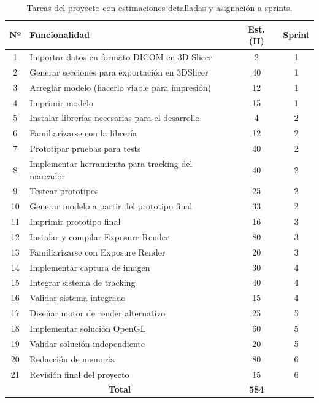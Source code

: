 \begin{table}[h!]
  \centering
  \begin{tabular}{|c|p{7.5cm}|c|c|}
  \hline
  \rowcolor{udcpink!25}
  \textbf{Nº} & \textbf{Funcionalidad} & \textbf{Est. (H)} & \textbf{Sprint} \\\hline
  1     &   Importar datos en formato DICOM en 3D Slicer    &   2     & 1 \\
  2     &   Generar secciones para exportación en 3DSlicer &   40    & 1 \\
  3     &   Arreglar modelo (hacerlo viable para impresión) &   12    & 1 \\
  4     &   Imprimir modelo                                  &   15    & 1 \\
  5     &   Instalar librerías necesarias para el desarrollo &   4     & 2 \\
  6     &   Familiarizarse con la librería                   &   12    & 2 \\
  7     &   Prototipar pruebas para tests                    &   40    & 2 \\
  8     &   Implementar herramienta para tracking del marcador &   40    & 2 \\  
  9     &   Testear prototipos                               &   25    & 2 \\
  10    &   Generar modelo a partir del prototipo final      &   33    & 2 \\
  11    &   Imprimir prototipo final                         &   16    & 3 \\
  12    &   Instalar y compilar Exposure Render              &   80    & 3 \\
  13    &   Familiarizarse con Exposure Render               &   20    & 3 \\
  14    &   Implementar captura de imagen                    &   30    & 4 \\
  15    &   Integrar sistema de tracking                     &   40    & 4 \\
  16    &   Validar sistema integrado                        &   15    & 4 \\
  17    &   Diseñar motor de render alternativo              &   25    & 5 \\
  18    &   Implementar solución OpenGL                      &   60    & 5 \\
  19    &   Validar solución independiente                   &   20    & 5 \\
  20    &   Redacción de memoria                             &   80    & 6 \\
  21    &   Revisión final del proyecto                      &   15    & 6 \\
  \hline
  \multicolumn{2}{|c|}{\textbf{Total}} & \textbf{584} & \\
  \hline
  \end{tabular}
  \caption{Tareas del proyecto con estimaciones detalladas y asignación a sprints.}
  \label{tab:tareas_completa}
\end{table}
